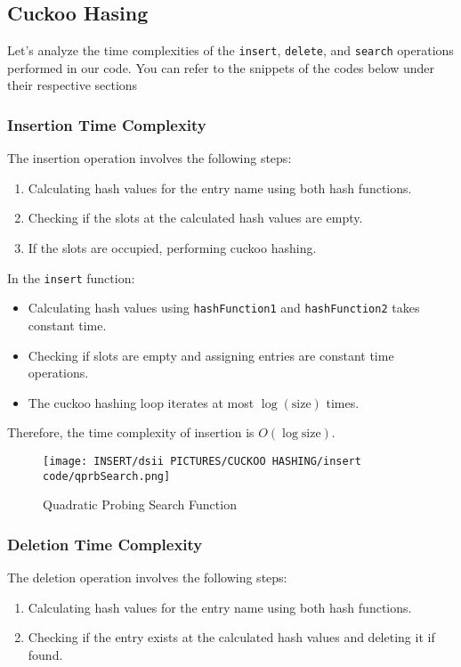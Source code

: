 \documentclass[12pt]{article}
\begin{document}
\subsection{Cuckoo Hasing}

Let's analyze the time complexities of the \texttt{insert}, \texttt{delete}, and \texttt{search} operations performed in our code. You can refer to the snippets of the codes below under their respective sections
\subsubsection{Insertion Time Complexity}


The insertion operation involves the following steps:
\begin{enumerate}
    \item Calculating hash values for the entry name using both hash functions.
    \item Checking if the slots at the calculated hash values are empty.
    \item If the slots are occupied, performing cuckoo hashing.
\end{enumerate}

In the \texttt{insert} function:
\begin{itemize}
    \item Calculating hash values using \texttt{hashFunction1} and \texttt{hashFunction2} takes constant time.
    \item Checking if slots are empty and assigning entries are constant time operations.
    \item The cuckoo hashing loop iterates at most $\log(\text{{size}})$ times.
\end{itemize}

Therefore, the time complexity of insertion is $O(\log \text{{size}})$.
\begin{figure}[htbp]
    \centering
    \texttt{[image: INSERT/dsii PICTURES/CUCKOO HASHING/insert code/qprbSearch.png]}
    \caption{Quadratic Probing Search Function}
    \label{fig:insertion_step1}
\end{figure}

\newpage

\subsubsection{Deletion Time Complexity}

The deletion operation involves the following steps:
\begin{enumerate}
    \item Calculating hash values for the entry name using both hash functions.
    \item Checking if the entry exists at the calculated hash values and deleting it if found.
\end{enumerate}
\end{document}
